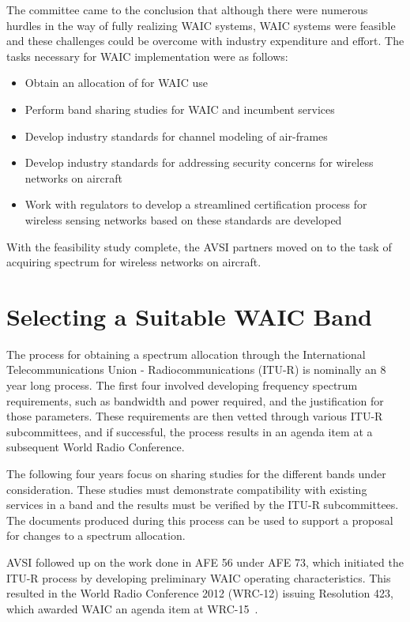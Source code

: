 The committee came to the conclusion that although there were numerous hurdles in the way of fully realizing WAIC systems, WAIC systems were feasible and these challenges could be overcome with industry expenditure and effort. The tasks necessary for WAIC implementation were as follows: 
\begin{itemize}
\item Obtain an allocation of for WAIC use
\item Perform band sharing studies for WAIC and incumbent services
\item Develop industry standards for channel modeling of air-frames
\item Develop industry standards for addressing security concerns for wireless networks on aircraft
\item Work with regulators to develop a streamlined certification process for wireless sensing networks based on these standards are developed
\end{itemize}
 
With the feasibility study complete, the AVSI partners moved on to the task of acquiring spectrum for wireless networks on aircraft. 
 
\section{Selecting a Suitable WAIC Band}
The process for obtaining a spectrum allocation through the International Telecommunications Union - Radiocommunications (ITU-R) is nominally an 8 year long process. The first four involved developing frequency spectrum requirements, such as bandwidth and power required, and the justification for those parameters. These requirements are then vetted through various ITU-R subcommittees, and if successful, the process results in an agenda item at a subsequent World Radio Conference.  

The following four years focus on sharing studies for the different bands under consideration. These studies must demonstrate compatibility with existing services in a band and the results must be verified by the ITU-R subcommittees. The documents produced during this process can be used to support a proposal for changes to a spectrum allocation. 

AVSI followed up on the work done in AFE 56 under AFE 73, which initiated the ITU-R process by developing preliminary WAIC operating characteristics. This resulted in the World Radio Conference 2012 (WRC-12) issuing Resolution 423, which awarded WAIC an agenda item at WRC-15~\cite{Res_423}.

